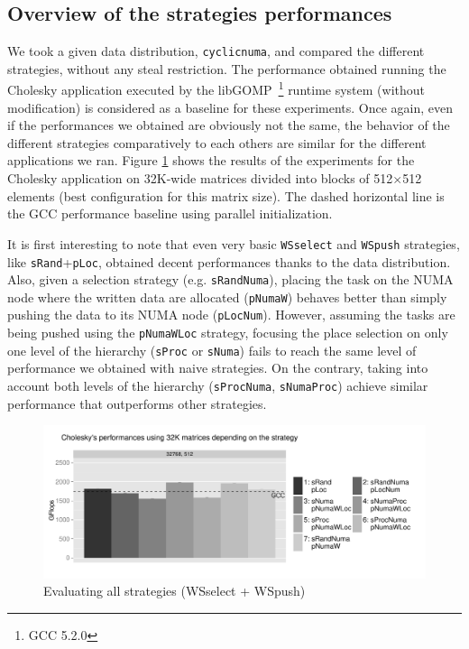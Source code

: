 \documentclass[parallelisme]{compas2016}
\begin{document}


\subsection{Overview of the strategies performances}

We took a given data distribution, \verb/cyclicnuma/, and compared the different strategies, without any steal restriction.
The performance obtained running the Cholesky application 
executed by the libGOMP~\footnote{GCC 5.2.0} runtime system (without modification) is considered as a baseline for these experiments.
Once again, even if the performances we obtained are obviously not the same, the behavior of the different strategies comparatively to each others are similar for the different applications we ran.
Figure \ref{fig:eval-all-strat} shows the results of the experiments for the
Cholesky application on 32K-wide matrices divided into blocks of 512$\times$512 elements (best configuration for this matrix size).
The dashed horizontal line is the GCC performance baseline using parallel initialization.

It is first interesting to note that even very basic \verb/WSselect/
and \verb/WSpush/ strategies, like \verb/sRand/+\verb/pLoc/, obtained decent performances
thanks to the data distribution.
Also, given a selection strategy (e.g. \verb/sRandNuma/), placing
the task on the NUMA node where the written data are allocated (\verb/pNumaW/) behaves better than simply pushing the data to its NUMA node (\verb/pLocNum/).
However, assuming the tasks are being pushed using the \verb/pNumaWLoc/ strategy, focusing the
place selection on only one level of the hierarchy (\verb/sProc/ or \verb/sNuma/)
fails to reach the same level of performance we obtained with naive strategies.
On the contrary, taking into account both levels of the hierarchy (\verb/sProcNuma/,
\verb/sNumaProc/) achieve similar performance that outperforms other strategies.

\begin{figure}[t]
  \centering
  \includegraphics[scale=0.5]{figures/graph_all_strat.pdf}
  \caption{Evaluating all strategies (WSselect + WSpush)}
\label{fig:eval-all-strat}
\end{figure}
\end{document}

